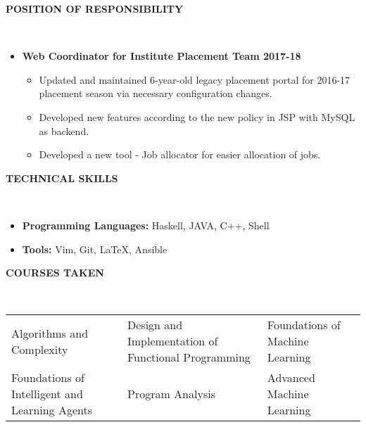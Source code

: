 \documentclass[a4paper,10pt]{article}
\newcommand{\isep}{-2 pt}
\newcommand{\lsep}{-0.5cm}
\newcommand{\resheading}[1]{{\small \colorbox{mygrey}{\begin{minipage}{0.975\textwidth}{\textbf{#1 \vphantom{p\^{E}}}}\end{minipage}}}}
\begin{document}
 

	


\resheading{\textbf{POSITION OF RESPONSIBILITY} }\\[\lsep]
\begin{itemize} \itemsep \isep
	\item \noindent \textbf{Web Coordinator for Institute Placement Team 2017-18} \\[-1.7em]
	\begin{itemize} \itemsep \isep
		\item Updated and maintained 6-year-old legacy placement portal for 2016-17 placement season via necessary configuration changes.
		\item Developed new features according to the new policy in JSP with MySQL as backend.
		\item Developed a new tool - Job allocator for easier allocation of jobs.
	\end{itemize}


\end{itemize}

\resheading{\textbf{TECHNICAL SKILLS} }\\[\lsep]
\begin{itemize} \itemsep \isep
	\item \noindent \textbf{Programming Languages:} Haskell, JAVA, C++, Shell
	\item \textbf{Tools:} Vim, Git, \LaTeX, Ansible

\end{itemize}



\resheading{\textbf{COURSES TAKEN} }\\[\lsep]
\begin{center}
\begin{table}[htb]
\begin{tabularx}{\textwidth}{Y Y Y}
Algorithms and Complexity & Design and Implementation of Functional Programming & Foundations of Machine Learning \\
Foundations of Intelligent and Learning Agents & Program Analysis & Advanced Machine Learning\\[-0.8cm]
\end{tabularx}
\end{table}
\end{center}
\end{document}
